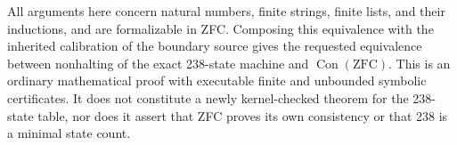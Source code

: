 All arguments here concern natural numbers, finite strings, finite
lists, and their inductions, and are formalizable in ZFC.  Composing this
equivalence with the inherited calibration of the boundary source gives
the requested equivalence between nonhalting of the exact 238-state
machine and $\operatorname{Con}(\mathrm{ZFC})$.  This is an ordinary
mathematical proof with executable finite and unbounded symbolic
certificates.  It does not constitute a newly kernel-checked theorem for
the 238-state table, nor does it assert that ZFC proves its own
consistency or that 238 is a minimal state count.
